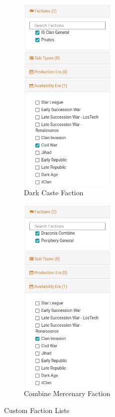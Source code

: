 \documentclass[UTF8]{article}
\begin{document}
\begin{figure}[h!]
  \centering
  \begin{subfigure}{0.4\textwidth}
    \centering
    \includegraphics[height=3.8in]{../img/Dark_Caste_List.png}
    \caption{Dark Caste Faction}
  \end{subfigure}
  \hspace{1in}
  \begin{subfigure}{0.4\textwidth}
    \centering
    \includegraphics[height=3.8in]{../img/Combine_Mercenary_List.png}
    \caption{Combine Mercenary Faction}
  \end{subfigure}
  \caption{Custom Faction Lists}
\end{figure}

\newpage
\end{document}
